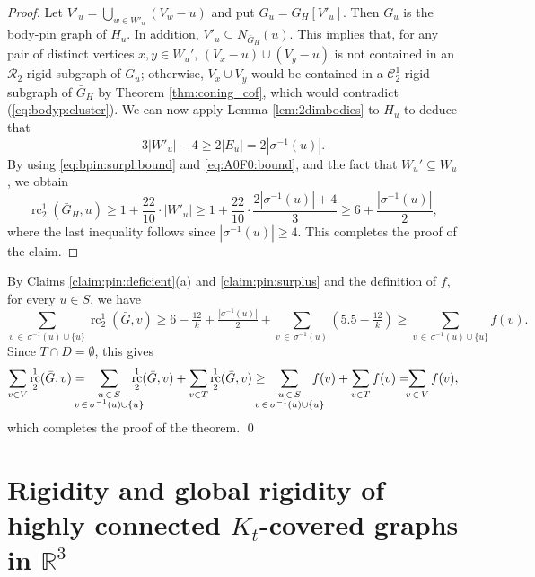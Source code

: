\documentclass[11pt,a4paper]{article}
\theoremstyle{definition}
\DeclareMathOperator{\rc}{rc}
\newcommand{\cC}{\mathcal{C}}
\begin{document}
\begin{proof}
Let
$V'_u=\bigcup_{w\in W'_u} (V_w-u)$ and put $G_u=G_H[V'_u]$.
Then $G_u$ is the body-pin graph of $H_u$. 
In addition, $V'_u\subseteq N_{\bar G_H}(u)$.
This implies that, for any pair  of distinct vertices $x,y\in W_u'$, $(V_x-u)\cup (V_y-u)$ is not contained in an $\mathcal{R}_2$-rigid subgraph of $G_u$; otherwise, $V_x\cup V_y$ would be contained in a $\cC_2^1$-rigid subgraph of $\bar G_H$ by Theorem \ref{thm:coning_cof}, which would contradict (\ref{eq:bodyp:cluster}). We can now apply
Lemma \ref{lem:2dimbodies} to $H_u$ to deduce that
\begin{equation}\label{eq:A0F0:bound}
3|W'_u|-4\geq 2|E_u| =2|\sigma^{-1}(u)|.
\end{equation}
By using \eqref{eq:bpin:surpl:bound} and \eqref{eq:A0F0:bound}, and the fact that $W_u'\subseteq W_u$, we  obtain
$$\rc_2^1(\bar G_H, u)\geq 1+\frac{22}{10}\cdot |W'_u|\geq 1+\frac{22}{10}\cdot\frac{2 |\sigma^{-1}(u)|+4}{3}\geq 6+\frac{|\sigma^{-1}(u)|}{2},$$
where the 
last inequality follows since $|\sigma^{-1}(u)|\geq 4$. This completes the proof of the claim.
\end{proof}



By Claims \ref{claim:pin:deficient}(a) and 
\ref{claim:pin:surplus} and the definition of $f$, for every $u\in S$, we have
$$	\sum_{v \, \in \,\sigma^{-1}(u) \cup \{u\}} \rc_2^1(\bar G,v) \geq 
6-\tfrac{12}{k} +\tfrac{|\sigma^{-1}(u)|}{2}+\sum_{v \, \in \, \sigma^{-1}(u)}(5.5-\tfrac{12}{k})
\geq \sum_{v \, \in \,\sigma^{-1}(u) \cup \{u\}}f(v).$$
Since $T\cap D=\emptyset$, this gives
$$\sum_{v\in V}\hspace{0cm}\rc_2^1(\bar G, v)=\hspace{-0.4cm} \sum_{\substack{u\, \in\, S\\v\,\in\, \sigma^{-1}(u)\cup \{u\}}}\hspace{-0.4cm}\rc_2^1(\bar G,v) + \sum_{v\in T} \rc_2^1(\bar G,v) \geq
\hspace{-0.4cm}\sum_{\substack{u\, \in\, S\\v\,\in\, \sigma^{-1}(u)\cup \{u\}}}\hspace{-0.4cm}f(v) + \sum_{v\in T} f(v)
= \hspace{-0.2cm}\sum_{v\,\in\, V}\hspace{0cm}f(v),$$
which completes the proof of the theorem.
\qed







\section{Rigidity and global rigidity of highly connected $K_t $-covered graphs in $\mathbb{R}^3$}
\end{document}
